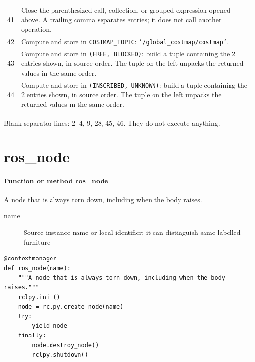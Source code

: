 \documentclass[11pt,a4paper]{book}
\begin{document}
\begin{longtable}{r p{}}
41 & Close the parenthesized call, collection, or grouped expression opened above. A trailing comma separates entries; it does not call another operation. \\

42 & Compute and store in \texttt{COSTMAP\_TOPIC}: \texttt{'/global\_costmap/costmap'}.  \\

43 & Compute and store in \texttt{(FREE, BLOCKED)}: build a tuple containing the 2 entries shown, in source order. The tuple on the left unpacks the returned values in the same order. \\

44 & Compute and store in \texttt{(INSCRIBED, UNKNOWN)}: build a tuple containing the 2 entries shown, in source order. The tuple on the left unpacks the returned values in the same order. \\

\end{longtable}

Blank separator lines: 2, 4, 9, 28, 45, 46. They do not execute anything.

\section{ros\_node}

\paragraph{Function or method ros\_node}
A node that is always torn down, including when the body raises.

\begin{description}
\item[name] Source instance name or local identifier; it can distinguish same-labelled furniture.
\end{description}

\begin{lstlisting}[firstnumber=47]
@contextmanager
def ros_node(name):
    """A node that is always torn down, including when the body raises."""
    rclpy.init()
    node = rclpy.create_node(name)
    try:
        yield node
    finally:
        node.destroy_node()
        rclpy.shutdown()


\end{lstlisting}
\end{document}
